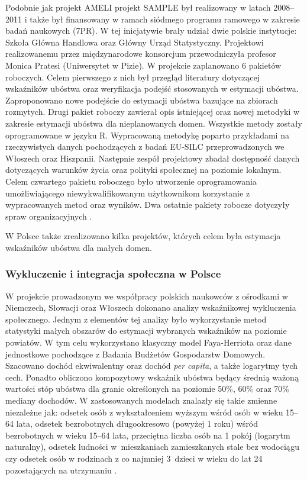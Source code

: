 Podobnie jak projekt AMELI projekt SAMPLE był realizowany w latach 2008--2011 i także był finansowany w ramach siódmego programu ramowego w zakresie badań naukowych (7PR). W tej inicjatywie brały udział dwie polskie instytucje: Szkoła Główna Handlowa oraz Główny Urząd Statystyczny. Projektowi realizowanemu przez międzynarodowe konsorcjum przewodniczyła profesor Monica Pratesi (Uniwersytet w Pizie). W projekcie zaplanowano 6 pakietów roboczych. Celem pierwszego z nich był przegląd literatury dotyczącej wskaźników ubóstwa oraz weryfikacja podejść stosowanych w estymacji ubóstwa. Zaproponowano nowe podejście do estymacji ubóstwa bazujące na zbiorach rozmytych. Drugi pakiet roboczy zawierał opis istniejącej oraz nowej metodyki w zakresie estymacji ubóstwa dla nieplanowanych domen. Wszystkie metody zostały oprogramowane w języku R. Wypracowaną metodykę poparto przykładami na rzeczywistych danych pochodzących z badań EU-SILC przeprowadzonych we Włoszech oraz Hiszpanii. Następnie zespół projektowy zbadał dostępność danych dotyczących warunków życia oraz polityki społecznej na poziomie lokalnym. Celem czwartego pakietu roboczego było utworzenie oprogramowania umożliwiającego niewykwalifikowanym użytkownikom korzystanie z wypracowanych metod oraz wyników. Dwa ostatnie pakiety robocze dotyczyły spraw organizacyjnych \citep{sample}. 

\vspace{1em}

\noindent W Polsce także zrealizowano kilka projektów, których celem była estymacja wskaźników ubóstwa dla małych domen.

\subsubsection*{Wykluczenie i integracja społeczna w Polsce}

W projekcie prowadzonym we współpracy polskich naukowców z ośrodkami w Niemczech, Słowacji oraz Włoszech dokonano analizy wskaźnikowej wykluczenia społecznego. Jednym z elementów tej analizy było wykorzystanie metod statystyki małych obszarów do estymacji wybranych wskaźników na poziomie powiatów. W tym celu wykorzystano klasyczny model Faya-Herriota \citep{fh1979} oraz dane jednostkowe pochodzące z Badania Budżetów Gospodarstw Domowych. Szacowano dochód ekwiwalentny oraz dochód \textit{per capita}, a także logarytmy tych cech. Ponadto obliczono kompozytowy wskaźnik ubóstwa będący średnią ważoną wartości stóp ubóstwa dla granic określonych na poziomie 50\%, 60\% oraz 70\% mediany dochodów. W zastosowanych modelach znalazły się takie zmienne niezależne jak: odsetek osób z wykształceniem wyższym wśród osób w wieku 15--64 lata, odsetek bezrobotnych długookresowo (powyżej 1 roku) wśród bezrobotnych w wieku 15--64 lata, przeciętna liczba osób na 1 pokój (logarytm naturalny), odsetek ludności w~mieszkaniach zamieszkanych stale bez wodociągu czy odsetek osób w rodzinach z co najmniej 3~dzieci w wieku do lat 24 pozostających na utrzymaniu \citep{wykluczenie2006}.

